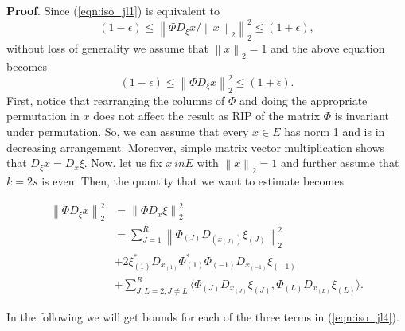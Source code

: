 \documentclass[twoside,11pt]{article}
\newcommand\norm[1]{\left\lVert#1\right\rVert}
\begin{document}
\noindent
{\bf Proof}. Since (\ref{eqn:iso_jl1}) is equivalent to 
\begin{equation}
    \label{eqn:iso_jl2}
    (1 - \epsilon) \leq \norm{\Phi D_{\xi}x/ \norm{x}_2}_2^2 \leq (1 + \epsilon),
\end{equation}
without loss of generality we assume that $ \norm{x}_2 = 1$ and the above equation becomes
\begin{equation}
    \label{eqn:iso_jl3}
    (1 - \epsilon) \leq \norm{\Phi D_{\xi}x}_2^2 \leq (1 + \epsilon).
\end{equation}
First, notice that rearranging the columns of $\Phi$ and doing the appropriate permutation in $x$ does not affect the result as RIP of the matrix $\Phi$ is invariant under permutation. So, we can assume that every $x \in E$ has norm 1 and is in decreasing arrangement. Moreover, simple matrix vector multiplication shows that $D_\xi x = D_x \xi$. Now. let us fix $x\ in E$ with $\norm{x}_2 = 1$ and further assume that $k = 2s$ is even. Then, the quantity that we want to estimate becomes

\begin{equation}
    \label{eqn:iso_jl4}
    \begin{split}
    \norm{\Phi D_{\xi}x}_2^2 & = \norm{\Phi D_{x}\xi}_2^2 \\
    & = \sum_{J=1}^R \norm{\Phi_{(J)} D_{(x_{(J)})} \xi_{(J)}}_2^2 \\
    & + 2 \xi_{(1)}^* D_{x_{(1)}} \Phi_{(1)}^* \Phi_{(-1)} D_{x_{(-1)}} \xi_{(-1)} \\
    & + \sum_{J,L = 2, J \not = L }^R \langle \Phi_{(J)} D_{x_{(J)}} \xi_{(J)}, \Phi_{(L)} D_{x_{(L)}} \xi_{(L)} \rangle.
    \end{split}
\end{equation}

In the following we will get bounds for each of the three terms in (\ref{eqn:iso_jl4}).
\end{document}
